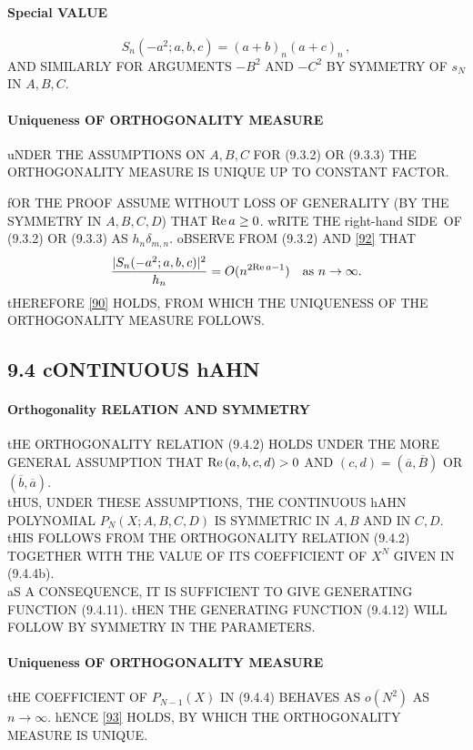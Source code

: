 \documentclass[twoside,11pt]{article}
\newcommand\de\delta
\newcommand\iy\infty
\newcommand\RHS{right-hand SIDE}
\renewcommand\Re{{\rm Re}\,}
\begin{document}
\paragraph{Special VALUE} 
\begin{equation} 
S_n(-a^2;a,b,c)=(a+b)_n(a+c)_n\,, 
\label{92} 
\end{equation} 
AND SIMILARLY FOR ARGUMENTS $-B^2$ AND $-C^2$ BY SYMMETRY OF $s_N$ IN $A,B,C$. 
% 
\paragraph{Uniqueness OF ORTHOGONALITY MEASURE} 
uNDER THE ASSUMPTIONS ON $A,B,C$ FOR (9.3.2) OR (9.3.3) THE ORTHOGONALITY 
MEASURE IS UNIQUE UP TO CONSTANT FACTOR. 
 
fOR THE PROOF ASSUME WITHOUT 
LOSS OF GENERALITY (BY THE SYMMETRY IN $A,B,C,D$) THAT $\Re a\geq0$. 
wRITE THE \RHS\ OF (9.3.2) OR (9.3.3) AS $h_n\de_{m,n}$. 
oBSERVE FROM (9.3.2) AND \eqref{92} THAT 
\[ 
\frac{|S_n(-a^2;a,b,c)|^2}{h_n} = O(n^{2\Re a-1})\quad 
\hbox{as $n\to\iy$.} 
\] 
tHEREFORE \eqref{90} HOLDS, FROM WHICH THE UNIQUENESS OF THE ORTHOGONALITY 
MEASURE FOLLOWS. 
% 
\subsection*{9.4 cONTINUOUS hAHN} 
\label{sec9.4} 
% 
\paragraph{Orthogonality RELATION AND SYMMETRY} 
tHE ORTHOGONALITY RELATION (9.4.2) HOLDS UNDER THE MORE GENERAL ASSUMPTION THAT 
$\Re(a,b,c,d)>0$ AND $(c,d)=(\overline a,\overline B)$ OR $(\overline b,\overline a)$.\\ 
tHUS, UNDER THESE ASSUMPTIONS, THE CONTINUOUS hAHN POLYNOMIAL 
$P_N(X;A,B,C,D)$ 
IS SYMMETRIC IN $A,B$ AND IN $C,D$. 
tHIS FOLLOWS FROM THE ORTHOGONALITY RELATION (9.4.2) 
TOGETHER WITH THE VALUE OF ITS COEFFICIENT OF $X^N$ GIVEN IN (9.4.4b).\\ 
aS A CONSEQUENCE, IT IS SUFFICIENT TO GIVE GENERATING FUNCTION (9.4.11). tHEN THE GENERATING 
FUNCTION (9.4.12) WILL FOLLOW BY SYMMETRY IN THE PARAMETERS. 
% 
\paragraph{Uniqueness OF ORTHOGONALITY MEASURE} 
tHE COEFFICIENT OF $P_{N-1}(X)$ IN (9.4.4) BEHAVES AS $o(N^2)$ AS $n\to\iy$. 
hENCE \eqref{93} HOLDS, BY WHICH THE ORTHOGONALITY MEASURE IS UNIQUE. 
% 
\end{document}
